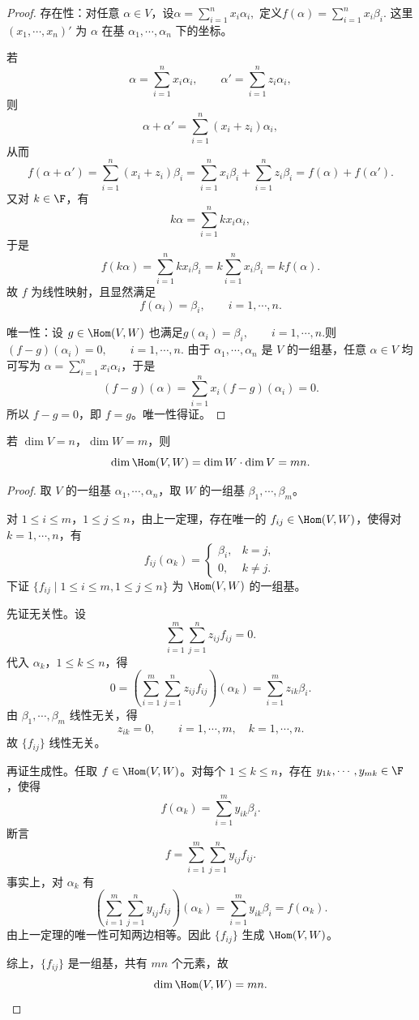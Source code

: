 \begin{proof}
	存在性：对任意 $\alpha\in V$，设$ \alpha=\sum\limits_{i=1}^{n}x_i\alpha_i,$
	定义$f(\alpha)=\sum\limits_{i=1}^{n}x_i\beta_i.$
	这里 $(x_1,\cdots,x_n)'$ 为 $\alpha$ 在基
	$\alpha_1,\cdots,\alpha_n$ 下的坐标。
	
	若
	\[
	\alpha=\sum_{i=1}^{n}x_i\alpha_i,
	\qquad
	\alpha'=\sum_{i=1}^{n}z_i\alpha_i,
	\]
	则
	\[
	\alpha+\alpha'=\sum_{i=1}^{n}(x_i+z_i)\alpha_i,
	\]
	从而
	\[
	f(\alpha+\alpha')
	=
	\sum_{i=1}^{n}(x_i+z_i)\beta_i
	=
	\sum_{i=1}^{n}x_i\beta_i+
	\sum_{i=1}^{n}z_i\beta_i
	=f(\alpha)+f(\alpha').
	\]
	又对 $k\in\F$，有
	\[
	k\alpha=\sum_{i=1}^{n}kx_i\alpha_i,
	\]
	于是
	\[
	f(k\alpha)=\sum_{i=1}^{n}kx_i\beta_i
	=k\sum_{i=1}^{n}x_i\beta_i
	=kf(\alpha).
	\]
	故 $f$ 为线性映射，且显然满足
	\[
	f(\alpha_i)=\beta_i,
	\qquad i=1,\cdots,n.
	\]
	
	唯一性：设 $g\in\Hom(V,W)$ 也满足$g(\alpha_i)=\beta_i,
	\qquad i=1,\cdots,n. $则$(f-g)(\alpha_i)=0,
	\qquad i=1,\cdots,n. $
	由于 $\alpha_1,\cdots,\alpha_n$ 是 $V$ 的一组基，任意
	$\alpha\in V$ 均可写为 $\alpha=\sum\limits_{i=1}^{n}x_i\alpha_i$，于是
	\[
	(f-g)(\alpha)
	=
	\sum_{i=1}^{n}x_i(f-g)(\alpha_i)=0.
	\]
	所以 $f-g=0$，即 $f=g$。唯一性得证。
\end{proof}

\begin{corollary}
	若 $\dim V=n$，$\dim W=m$，则
	\[
	\dim \Hom(V,W)=\dim W\cdot \dim V=mn.
	\]
\end{corollary}

\begin{proof}
	取 $V$ 的一组基 $\alpha_1,\cdots,\alpha_n$，取 $W$ 的一组基
	$\beta_1,\cdots,\beta_m$。
	
	对 $1\leq i\leq m$，$1\leq j\leq n$，由上一定理，存在唯一的
	$f_{ij}\in\Hom(V,W)$，使得对 $k=1,\cdots,n$，有
	\[
	f_{ij}(\alpha_k)=
	\begin{cases}
		\beta_i, & k=j,\\
		0, & k\neq j.
	\end{cases}
	\]
	下证 $\{f_{ij}\mid 1\leq i\leq m,
	1\leq j\leq n\}$ 为 $\Hom(V,W)$ 的一组基。
	
	先证无关性。设
	\[
	\sum_{i=1}^{m}\sum_{j=1}^{n}z_{ij}f_{ij}=0.
	\]
	代入 $\alpha_k$，$1\leq k\leq n$，得
	\[
	0=
	\left(\sum_{i=1}^{m}\sum_{j=1}^{n}z_{ij}f_{ij}\right)(\alpha_k)
	=\sum_{i=1}^{m}z_{ik}\beta_i.
	\]
	由 $\beta_1,\cdots,\beta_m$ 线性无关，得
	\[
	z_{ik}=0,
	\qquad i=1,\cdots,m,
	\quad k=1,\cdots,n.
	\]
	故 $\{f_{ij}\}$ 线性无关。
	
	再证生成性。任取 $f\in\Hom(V,W)$。对每个
	$1\leq k\leq n$，存在 $y_{1k},\cdots,y_{mk}\in\F$，使得
	\[
	f(\alpha_k)=\sum_{i=1}^{m}y_{ik}\beta_i.
	\]
	断言
	\[
	f=\sum_{i=1}^{m}\sum_{j=1}^{n}y_{ij}f_{ij}.
	\]
	事实上，对 $\alpha_k$ 有
	\[
	\left(\sum_{i=1}^{m}\sum_{j=1}^{n}y_{ij}f_{ij}\right)(\alpha_k)
	=
	\sum_{i=1}^{m}y_{ik}\beta_i
	=f(\alpha_k).
	\]
	由上一定理的唯一性可知两边相等。因此 $\{f_{ij}\}$ 生成
	$\Hom(V,W)$。
	
	综上，$\{f_{ij}\}$ 是一组基，共有 $mn$ 个元素，故
	\[
	\dim\Hom(V,W)=mn.
	\]
\end{proof}

